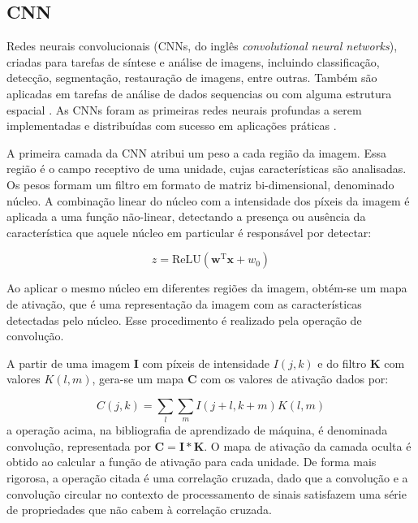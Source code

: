 \subsection{CNN}
Redes neurais convolucionais (CNNs, do inglês \textit{convolutional neural
networks}), criadas para tarefas de síntese e análise de imagens, incluindo
classificação, detecção, segmentação, restauração de imagens, entre outras.
Também são aplicadas em tarefas de análise de dados sequencias ou com alguma
estrutura espacial \cite{Bishop:DeepLearning24}. As CNNs foram as primeiras
redes neurais profundas a serem implementadas e distribuídas com sucesso em
aplicações práticas \cite{lecun1989}.

A primeira camada da CNN atribui um peso a cada região da imagem. Essa região é
o campo receptivo de uma unidade, cujas características são analisadas.
Os pesos formam um filtro em formato de matriz bi-dimensional, denominado
núcleo. A combinação linear do núcleo com a intensidade dos píxeis da imagem é
aplicada a uma função não-linear, detectando a presença ou ausência da
característica que aquele núcleo em particular é responsável por detectar:

\begin{equation}
    z = \text{ReLU}(\mathbf{w}^\text{T} \mathbf{x} + w_0)
\end{equation}

Ao aplicar o mesmo núcleo em diferentes regiões da imagem, obtém-se um mapa de
ativação, que é uma representação da imagem com as características detectadas
pelo núcleo. Esse procedimento é realizado pela operação de convolução.

A partir de uma imagem $\mathbf{I}$ com píxeis de intensidade $I(j, k)$
e do filtro $\mathbf{K}$ com valores $K(l, m)$, gera-se um mapa $\mathbf{C}$ com
os valores de ativação dados por:

\begin{equation}
    C(j, k) = \sum_{l} \sum_{m} I(j+l, k+m)K(l, m)
\end{equation}
a operação acima, na bibliografia de aprendizado de máquina, é denominada
convolução, representada por $\mathbf{C} = \mathbf{I} * \mathbf{K}$. O mapa de
ativação da camada oculta é obtido ao calcular a função de ativação para cada
unidade. De forma mais rigorosa, a operação citada é uma correlação cruzada, dado
que a convolução e a convolução circular no contexto de processamento de sinais
satisfazem uma série de propriedades que não cabem à correlação cruzada.

